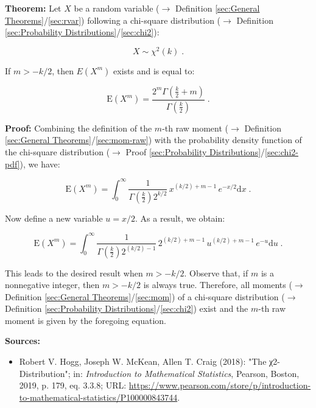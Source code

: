 \documentclass[a4paper,12pt,twoside]{book}
\begin{document}
\textbf{Theorem:} Let $X$ be a random variable ($\rightarrow$ Definition \ref{sec:General Theorems}/\ref{sec:rvar}) following a chi-square distribution ($\rightarrow$ Definition \ref{sec:Probability Distributions}/\ref{sec:chi2}):

\begin{equation} \label{eq:chi2-mom-chi2}
X \sim \chi^{2}(k) \; .
\end{equation}

If $m > -k/2$, then $E(X^{m})$ exists and is equal to:

\begin{equation} \label{eq:chi2-mom-chi2-mom}
\mathrm{E}(X^{m}) = \frac{2^{m} \Gamma\left( \frac{k}{2}+m \right)}{\Gamma\left( \frac{k}{2} \right)} \; .
\end{equation}


\vspace{1em}
\textbf{Proof:} Combining the definition of the $m$-th raw moment ($\rightarrow$ Definition \ref{sec:General Theorems}/\ref{sec:mom-raw}) with the probability density function of the chi-square distribution ($\rightarrow$ Proof \ref{sec:Probability Distributions}/\ref{sec:chi2-pdf}), we have:

\begin{equation} \label{eq:chi2-mom-chi2-mom-int}
\mathrm{E}(X^{m}) = \int_{0}^{\infty} \frac{1}{\Gamma\left( \frac{k}{2} \right) 2^{k/2}} \, x^{(k/2)+m-1} \, e^{-x/2} \mathrm{d}x \; . 
\end{equation}

Now define a new variable $u = x/2$. As a result, we obtain:

\begin{equation} \label{eq:chi2-mom-chi-2-mom-int-u}
\mathrm{E}(X^{m}) = \int_{0}^{\infty} \frac{1}{\Gamma\left( \frac{k}{2} \right) 2^{(k/2)-1}} \, 2^{(k/2)+m-1} \, u^{(k/2)+m-1} \, e^{-u} \mathrm{d}u \; .
\end{equation}

This leads to the desired result when $m > -k/2$. Observe that, if $m$ is a nonnegative integer, then $m > -k/2$ is always true. Therefore, all moments ($\rightarrow$ Definition \ref{sec:General Theorems}/\ref{sec:mom}) of a chi-square distribution ($\rightarrow$ Definition \ref{sec:Probability Distributions}/\ref{sec:chi2}) exist and the $m$-th raw moment is given by the foregoing equation.


\vspace{1em}
\textbf{Sources:}
\begin{itemize}
\item Robert V. Hogg, Joseph W. McKean, Allen T. Craig (2018): "The χ2-Distribution"; in: \textit{Introduction to Mathematical Statistics}, Pearson, Boston, 2019, p. 179, eq. 3.3.8; URL: \url{https://www.pearson.com/store/p/introduction-to-mathematical-statistics/P100000843744}.
\end{itemize}
\end{document}
